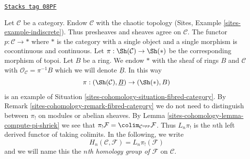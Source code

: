 \begin{example}

\label{sites-cohomology-example-category-to-point}
\href{https://stacks.math.columbia.edu/tag/08PF}{\texttt{Stacks tag 08PF}}

Let $\mathcal{C}$ be a category. Endow $\mathcal{C}$ with the chaotic
topology (Sites, Example \ref{sites-example-indiscrete}). Thus
presheaves and sheaves agree on $\mathcal{C}$.
The functor $p : \mathcal{C} \to *$ where $*$ is the category with a single
object and a single morphism is cocontinuous and continuous. Let
$\pi : \Sh(\mathcal{C}) \to \Sh(*)$ be the corresponding morphism
of topoi. Let $B$ be a ring. We endow $*$ with the sheaf of rings $B$
and $\mathcal{C}$ with $\mathcal{O}_\mathcal{C} = \pi^{-1}B$ which
we will denote $\underline{B}$. In this way
$$
\pi : (\Sh(\mathcal{C}), \underline{B}) \to (\Sh(*), B)
$$
is an example of Situation \ref{sites-cohomology-situation-fibred-category}.
By Remark \ref{sites-cohomology-remark-fibred-category} we do not need to distinguish
between $\pi_!$ on modules or abelian sheaves. By
Lemma \ref{sites-cohomology-lemma-compute-pi-shriek} we see that
$\pi_!\mathcal{F} = \colim_{\mathcal{C}^{opp}} \mathcal{F}$.
Thus $L_n\pi_!$ is the $n$th left derived functor of taking colimits.
In the following, we write
$$
H_n(\mathcal{C}, \mathcal{F}) = L_n\pi_!(\mathcal{F})
$$
and we will name this the {\it $n$th homology group of $\mathcal{F}$}
on $\mathcal{C}$.
\end{example}


